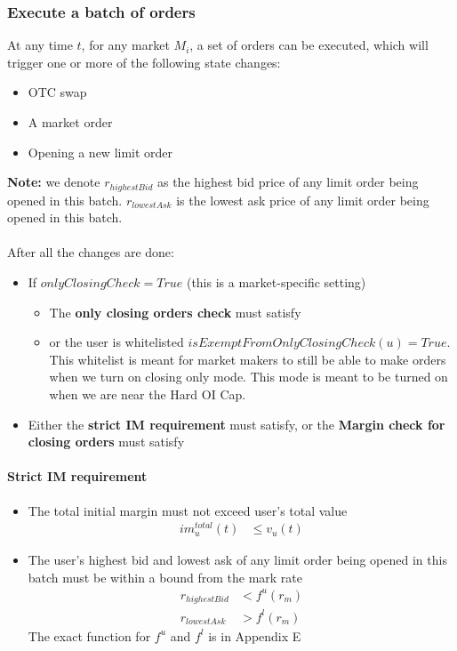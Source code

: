 \documentclass{article}%
\begin{document}
\subsubsection{Execute a batch of orders}
At any time $t$, for any market $M_i$, a set of orders can be executed, which will trigger one or more of the following state changes:
\begin{itemize}
    \item OTC swap
    \item A market order
    \item Opening a new limit order
\end{itemize}
\textbf{Note:} we denote $r_{highestBid}$ as the highest bid price of any limit order being opened in this batch. $r_{lowestAsk}$ is the lowest ask price of any limit order being opened in this batch.

\paragraph{}

After all the changes are done:
\begin{itemize}
    \item If $onlyClosingCheck = True$ (this is a market-specific setting)
    \begin{itemize}
        \item The \textbf{only closing orders check} must satisfy
        \item or the user is whitelisted $isExemptFromOnlyClosingCheck(u) = True$. This whitelist is meant for market makers to still be able to make orders when we turn on closing only mode. This mode is meant to be turned on when we are near the Hard OI Cap.
    \end{itemize}
    \item Either the \textbf{strict IM requirement} must satisfy, or the \textbf{Margin check for closing orders} must satisfy
\end{itemize}

\paragraph{Strict IM requirement}
\begin{itemize}
    \item The total initial margin must not exceed user's total value
    \begin{align*}
        im_u^{total}(t) &\leq v_u(t)
    \end{align*}
    \item The user's highest bid and lowest ask of any limit order being opened in this batch must be within a bound from the mark rate
    \begin{align*}
        r_{highestBid} &< f^u(r_m)\\
        r_{lowestAsk} &> f^l(r_m)
    \end{align*}
    The exact function for $f^u$ and $f^l$ is in Appendix E
\end{itemize}
\end{document}
